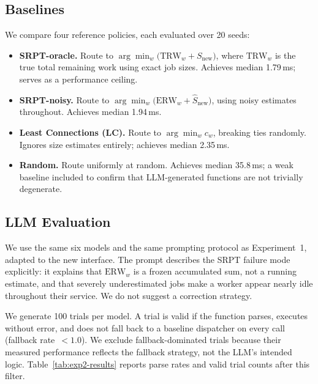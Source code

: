 \documentclass[11pt]{article}
\begin{document}
\subsection{Baselines}
\label{sec:exp2-baselines}

We compare four reference policies, each evaluated over 20 seeds:

\begin{itemize}
  \item \textbf{SRPT-oracle.} Route to $\arg\min_w
    \bigl(\mathrm{TRW}_w + S_\text{new}\bigr)$, where
    $\mathrm{TRW}_w$ is the true total remaining work using exact
    job sizes.
    Achieves median 1.79\,ms; serves as a performance ceiling.
  \item \textbf{SRPT-noisy.} Route to $\arg\min_w
    \bigl(\mathrm{ERW}_w + \hat{S}_\text{new}\bigr)$, using
    noisy estimates throughout.
    Achieves median 1.94\,ms.
  \item \textbf{Least Connections (LC).} Route to $\arg\min_w c_w$,
    breaking ties randomly.
    Ignores size estimates entirely; achieves median 2.35\,ms.
  \item \textbf{Random.} Route uniformly at random.
    Achieves median 35.8\,ms; a weak baseline included to confirm
    that LLM-generated functions are not trivially degenerate.
\end{itemize}

\subsection{LLM Evaluation}
\label{sec:exp2-llms}

We use the same six models and the same prompting protocol as
Experiment~1, adapted to the new interface.
The prompt describes the SRPT failure mode explicitly: it explains
that $\mathrm{ERW}_w$ is a frozen accumulated sum, not a running
estimate, and that severely underestimated jobs make a worker appear
nearly idle throughout their service.
We do not suggest a correction strategy.

We generate 100 trials per model.
A trial is valid if the function parses, executes without error,
and does not fall back to a baseline dispatcher on every call
(fallback rate~$< 1.0$).
We exclude fallback-dominated trials because their measured
performance reflects the fallback strategy, not the LLM's intended
logic.
Table~\ref{tab:exp2-results} reports parse rates and valid trial
counts after this filter.
\end{document}
